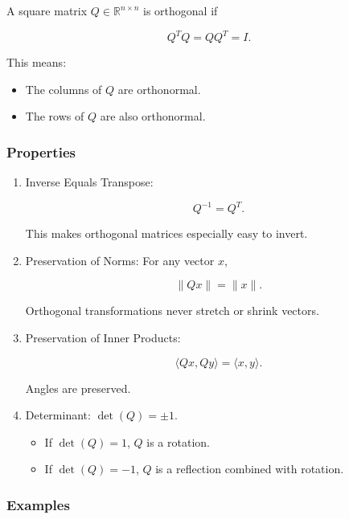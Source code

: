 \documentclass[
  letterpaper,
  DIV=11,
  numbers=noendperiod]{scrreprt}
\providecommand{\tightlist}{%
  \setlength{\itemsep}{0pt}\setlength{\parskip}{0pt}}
\begin{document}
A square matrix \(Q \in \mathbb{R}^{n \times n}\) is orthogonal if

\[
Q^T Q = QQ^T = I.
\]

This means:

\begin{itemize}
\tightlist
\item
  The columns of \(Q\) are orthonormal.
\item
  The rows of \(Q\) are also orthonormal.
\end{itemize}

\subsubsection{Properties}\label{properties}

\begin{enumerate}
\def\labelenumi{\arabic{enumi}.}
\item
  Inverse Equals Transpose:

  \[
  Q^{-1} = Q^T.
  \]

  This makes orthogonal matrices especially easy to invert.
\item
  Preservation of Norms: For any vector \(x\),

  \[
  \|Qx\| = \|x\|.
  \]

  Orthogonal transformations never stretch or shrink vectors.
\item
  Preservation of Inner Products:

  \[
  \langle Qx, Qy \rangle = \langle x, y \rangle.
  \]

  Angles are preserved.
\item
  Determinant: \(\det(Q) = \pm 1\).

  \begin{itemize}
  \tightlist
  \item
    If \(\det(Q) = 1\), \(Q\) is a rotation.
  \item
    If \(\det(Q) = -1\), \(Q\) is a reflection combined with rotation.
  \end{itemize}
\end{enumerate}

\subsubsection{Examples}\label{examples-4}
\end{document}
